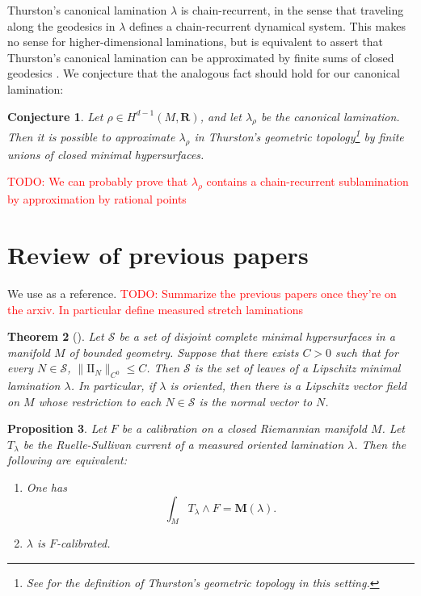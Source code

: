\documentclass[reqno,11pt]{amsart}
\newcommand{\RR}{\mathbf{R}}
\newcommand{\Two}{\mathrm{I\!I}}
\newcommand{\Mass}{\mathbf M}
\newtheorem{theorem}{Theorem}[section]
\newtheorem{proposition}[theorem]{Proposition}
\newtheorem{conjecture}[theorem]{Conjecture}
\theoremstyle{definition}
\numberwithin{equation}{section}
\newcommand\todo[1]{\textcolor{red}{TODO: #1}}
\begin{document}
Thurston's canonical lamination $\lambda$ is chain-recurrent, in the sense that traveling along the geodesics in $\lambda$ defines a chain-recurrent dynamical system.
This makes no sense for higher-dimensional laminations, but is equivalent to assert that Thurston's canonical lamination can be approximated by finite sums of closed geodesics \cite[\S9]{Gu_ritaud_2017}.
We conjecture that the analogous fact should hold for our canonical lamination:

\begin{conjecture}\label{chain recurrence}
Let $\rho \in H^{d - 1}(M, \RR)$, and let $\lambda_\rho$ be the canonical lamination.
Then it is possible to approximate $\lambda_\rho$ in Thurston's geometric topology\footnote{See \cite[\S1]{BackusCML} for the definition of Thurston's geometric topology in this setting.} by finite unions of closed minimal hypersurfaces.
\end{conjecture}

\todo{We can probably prove that $\lambda_\rho$ contains a chain-recurrent sublamination by approximation by rational points}


\section{Review of previous papers}\label{prevResults}
We use \cite{BackusCML, BackusBest1} as a reference.
\todo{Summarize the previous papers once they're on the arxiv. In particular define measured stretch laminations}

\begin{theorem}[{\cite[Theorem A]{BackusCML}}]\label{disjoint surfaces are lamination}
Let $\mathcal S$ be a set of disjoint complete minimal hypersurfaces in a manifold $M$ of bounded geometry.
Suppose that there exists $C > 0$ such that for every $N \in \mathcal S$, $\|\Two_N\|_{C^0} \leq C$.
Then $\mathcal S$ is the set of leaves of a Lipschitz minimal lamination $\lambda$.
In particular, if $\lambda$ is oriented, then there is a Lipschitz vector field on $M$ whose restriction to each $N \in \mathcal S$ is the normal vector to $N$.
\end{theorem}

\begin{proposition}\label{calibration condition}
Let $F$ be a calibration on a closed Riemannian manifold $M$.
Let $T_\lambda$ be the Ruelle-Sullivan current of a measured oriented lamination $\lambda$.
Then the following are equivalent:
\begin{enumerate}
\item One has \begin{equation}\label{calibration by Ruelle Sullivan}
\int_M T_\lambda \wedge F = \Mass(\lambda).
\end{equation}
\item $\lambda$ is $F$-calibrated.
\end{enumerate}
\end{proposition}
\end{document}
